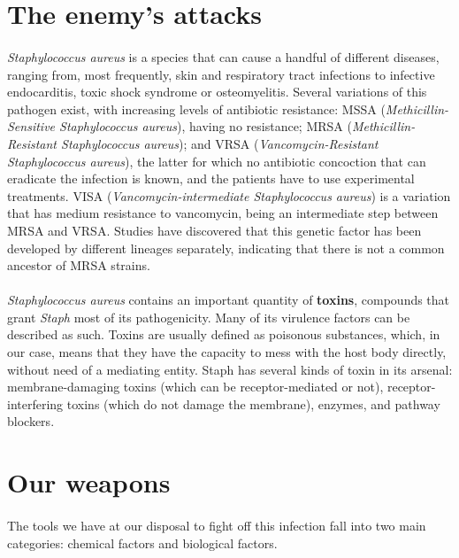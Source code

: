 \section{The enemy's attacks}
\paragraph{}\emph{Staphylococcus aureus} is a species that can cause a handful of different diseases, ranging from, most frequently, skin and respiratory tract infections to infective endocarditis, toxic shock syndrome or osteomyelitis. Several variations of this pathogen exist, with increasing levels of antibiotic resistance: MSSA (\emph{Methicillin-Sensitive Staphylococcus aureus}), having no resistance; MRSA (\emph{Methicillin-Resistant Staphylococcus aureus}); and VRSA (\emph{Vancomycin-Resistant Staphylococcus aureus}), the   latter for which no antibiotic concoction that can eradicate the infection is known, and the patients have to use experimental treatments. VISA (\emph{Vancomycin-intermediate Staphylococcus aureus}) is a variation that has medium resistance to vancomycin, being an intermediate step between MRSA and VRSA. Studies have discovered that this genetic factor has been developed by different lineages separately, indicating that there is not a common ancestor of MRSA strains.
\paragraph{}\emph{Staphylococcus aureus} contains an important quantity of \textbf{toxins}, compounds that grant \emph{Staph} most of its pathogenicity. Many of its virulence factors can be described as such. Toxins are usually defined as poisonous substances, which, in our case, means that they have the capacity to mess with the host body directly, without need of a mediating entity. Staph has several kinds of toxin in its arsenal: membrane-damaging toxins (which can be receptor-mediated or not), receptor-interfering toxins (which do not damage the membrane), enzymes, and pathway blockers\cite{kongTargetingStaphylococcusAureus2016}.\newline
\section{Our weapons}
\paragraph{} The tools we have at our disposal to fight off this infection fall into two main categories: chemical factors and biological factors.
